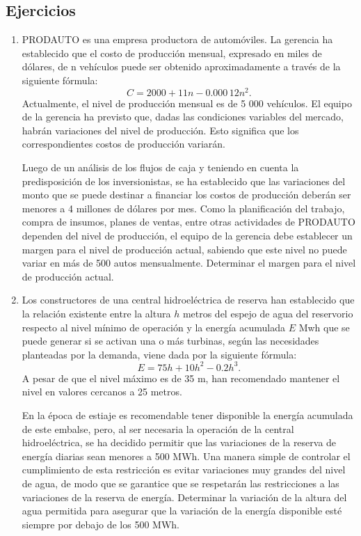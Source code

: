 \subsection{Ejercicios}
\begingroup
\small
\begin{multicols}{2}
\begin{enumerate}[leftmargin=*]
\item PRODAUTO es una empresa productora de automóviles. La gerencia ha establecido que el
    costo de producción mensual, expresado en miles de dólares, de n vehículos puede ser
    obtenido aproximadamente a través de la siguiente fórmula:
    \[
    C = 2 000 + 11n - 0.000\,12n^2.
    \]
    Actualmente, el nivel de producción mensual es de 5 000 vehículos. El equipo de la gerencia
    ha previsto que, dadas las condiciones variables del mercado, habrán variaciones del nivel
    de producción. Esto significa que los correspondientes costos de producción variarán.

    Luego de un análisis de los flujos de caja y teniendo en cuenta la predisposición de los
inversionistas, se ha establecido que las variaciones del monto que se puede destinar a
financiar los costos de producción deberán ser menores a 4 millones de dólares por mes. Como la
planificación del trabajo, compra de insumos, planes de ventas, entre otras actividades de
PRODAUTO dependen del nivel de producción, el equipo de la gerencia debe establecer un margen
para el nivel de producción actual, sabiendo que este nivel no puede variar en más de 500 autos
mensualmente. Determinar el margen para el nivel de producción actual.

\item Los constructores de una central hidroeléctrica de reserva han establecido que la
    relación existente entre la altura $h$ metros del espejo de agua del reservorio respecto al
    nivel mínimo de operación y la energía acumulada $E$ Mwh que se puede generar si se activan
    una o más turbinas, según las necesidades planteadas por la demanda, viene dada por la
    siguiente fórmula:
    \[
    E = 75h + 10h^2 - 0.2h^3.
    \]
    A pesar de que el nivel máximo es de 35 m, han recomendado mantener el nivel en valores
    cercanos a 25 metros.

    En la época de estiaje es recomendable tener disponible la energía acumulada de este
    embalse, pero, al ser necesaria la operación de la central hidroeléctrica, se ha decidido
    permitir que las variaciones de la reserva de energía diarias sean menores a 500 MWh. Una
    manera simple de controlar el cumplimiento de esta restricción es evitar variaciones muy
    grandes del nivel de agua, de modo que se garantice que se respetarán las restricciones a
    las variaciones de la reserva de energía. Determinar la variación de la altura del agua
    permitida para asegurar que la variación de la energía disponible esté siempre por debajo
    de los 500 MWh.
\end{enumerate}
\end{multicols}
\endgroup

